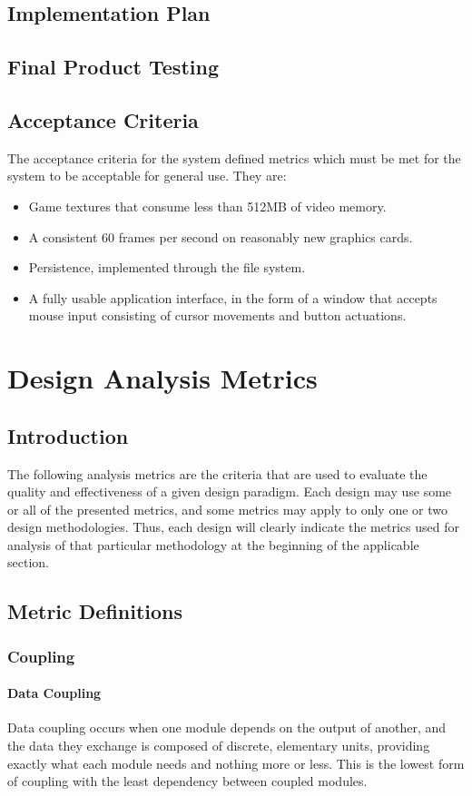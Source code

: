 \documentclass{article}
\begin{document}
	\subsection{Implementation Plan}
	\subsection{Final Product Testing}
	\subsection{Acceptance Criteria}
		The acceptance criteria for the system defined metrics which must be met for the system to be acceptable for general use. They are:
		\begin{itemize}
			\item Game textures that consume less than 512MB of video memory.
      \item A consistent 60 frames per second on reasonably new graphics cards.
			\item Persistence, implemented through the file system. 
			\item A fully usable application interface, in the form of a window that accepts mouse input consisting of cursor movements and button actuations.
		\end{itemize}
%
%
\section{Design Analysis Metrics}
	\subsection{Introduction}
		The following analysis metrics are the criteria that are used to evaluate the quality and effectiveness of a given design paradigm. Each design may use some or all of the presented metrics, and some metrics may apply to only one or two design methodologies. Thus, each design will clearly indicate the metrics used for analysis of that particular methodology at the beginning of the applicable section. 
	\subsection{Metric Definitions}
		\subsubsection{Coupling}
			\paragraph{Data Coupling}
				Data coupling occurs when one module depends on the output of another, and the data they exchange is composed of discrete, elementary units, providing exactly what each module needs and nothing more or less. This is the lowest form of coupling with the least dependency between coupled modules. 
\end{document}
